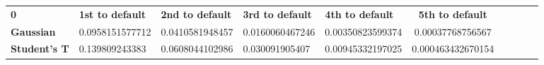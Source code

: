 \begin{center}
 \begin{tabular}{|l|l|l|l|l|c|c|c|c|c|}
\hline
\textbf{0} & \textbf{1st to default} & \textbf{2nd to default} & \textbf{3rd to default} & \textbf{4th to default} & \textbf{5th to default}\\\hhline{|=|=|=|=|=|=|}
\textbf{Gaussian} & 0.0958151577712 & 0.0410581948457 & 0.0160060467246 & 0.00350823599374 & 0.00037768756567\\
\textbf{Student's T} & 0.139809243383 & 0.0608044102986 & 0.030091905407 & 0.00945332197025 & 0.000463432670154\\
\hline
\end{tabular}
\end{center}
